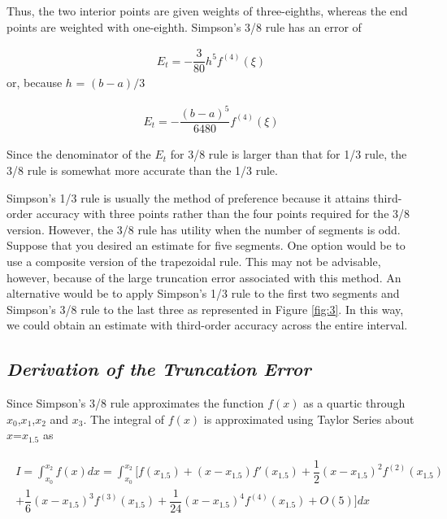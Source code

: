 \documentclass[book.tex]{subfiles}
\begin{document}
Thus, the two interior points are given weights of three-eighths, whereas the end points are weighted with one-eighth. Simpson's 3/8 rule has an error of

\begin{align}
E_t = -\dfrac{3}{80}h^5f^{(4)}(\xi)
\end{align}
or, because $h$ = $(b-a)/3$

\begin{align}
E_t = -\dfrac{(b-a)^5}{6480}f^{(4)}(\xi)
\end{align}

Since the denominator of the $E_t$ for 3/8 rule is larger than that for 1/3 rule, the 3/8 rule is somewhat more accurate than the 1/3 rule.


Simpson's 1/3 rule is usually the method of preference because it attains third-order accuracy with three points rather than the four points required for the 3/8 version. However, the 3/8 rule has utility when the number of segments is odd. Suppose that you desired an estimate for five segments. One option would be to use a composite version of the trapezoidal rule. This may not be advisable, however,
because of the large truncation error associated with this method. An alternative would be to apply Simpson's 1/3 rule to the first two segments and Simpson's 3/8 rule to the last three as represented in Figure \ref{fig:3}. In this way, we could obtain an estimate with third-order accuracy across the entire interval.

\subsection{\textit{Derivation of the Truncation Error}}

Since Simpson's 3/8 rule approximates the function $f(x)$ as a quartic through $x_0$,$x_1$,$x_2$ and $x_3$. The integral of $f(x)$ is approximated using Taylor Series about $x$=$x_{1.5}$ as	

\begin{align}
\begin{split}
I = \int_{x_0}^{x_2}f(x)dx = \int_{x_0}^{x_2}[f(x_{1.5}) + (x-x_{1.5})f'(x_{1.5}) + \dfrac{1}{2}(x-x_{1.5})^2f^{(2)}(x_{1.5}) \\
+ \dfrac{1}{6}(x-x_{1.5})^3f^{(3)}(x_{1.5}) + \dfrac{1}{24}(x-x_{1.5})^4f^{(4)}(x_{1.5}) + O(5)]dx
\end{split}
\end{align}
\end{document}
